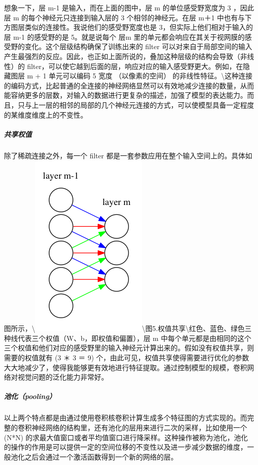 想象一下，层 m-1 是输入，而在上面的图中，层 m 的单位感受野宽度为 3
，因此层 m 的每个神经元只连接到输入层的 3 个相邻的神经元。在层 m＋1
中也有与下方图层类似的连接性。我说他们的感受野宽度也是
3，但实际上他们相对于输入的层 m-1 的感受野的是 5。就是说每个 层m
里的单元都会响应在其关于视网膜的感受野的变化。这个层级结构确保了训练出来的
filter
可以对来自于局部空间的输入产生最强烈的反应。因此，也正如上面所说的，叠加这种层级的结构会导致（非线性）的
filter，可以使它越到后面的层，响应对应的输入感受野更大。例如，在隐藏图层
m + 1 单元可以编码 5 宽度 （以像素的空间）
的非线性特征。\textbackslash{}这种连接的编码方式，比起普通的全连接的神经网络显然可以有效地减少连接的数量，从而能容纳更多的层数，对输入的数据进行更复杂的描述，加强了模型的表达能力。而且，只与上一层的相邻的局部的几个神经元连接的方式，可以使模型具备一定程度的某维度维度上的不变性。

\subparagraph{共享权值}\label{ux5171ux4eabux6743ux503c}

除了稀疏连接之外，每一个 filter
都是一套参数应用在整个输入空间上的。具体如图所示，\textbackslash{}\includegraphics{picture/shared-weights.png}\textbackslash{}图5.权值共享\textbackslash{}红色、蓝色、绿色三种线代表三个权值（W、b，即权值和偏置），层
m
中每个单元都是由相同的这个三个权值和他们对应的感受野里的输入神经元计算出来的。假如没有权值共享，则需要的权值就有
(3 ＊ 3 ＝ 9)
个，由此可见，权值共享使得需要进行优化的参数大大地减少了，使得我能够更有效地进行特征提取。通过控制模型的规模，卷积网络对视觉问题的泛化能力非常好。

\subparagraph{池化（pooling）}\label{ux6c60ux5316pooling}

以上两个特点都是由通过使用卷积核卷积计算生成多个特征图的方式实现的。而完整的卷积神经网络的结构里，还有池化的层用来进行二次的采样，比如使用一个
(N*N)
的求最大值窗口或者平均值窗口进行降采样。这种操作被称为池化，池化的操作的作用是可以提供一定的空间位移的不变性以及进一步减少数据的维度，一般池化之后会通过一个激活函数得到一个新的网络的层。


